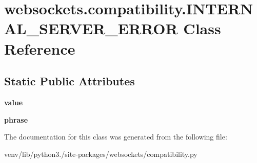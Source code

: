\hypertarget{classwebsockets_1_1compatibility_1_1_i_n_t_e_r_n_a_l___s_e_r_v_e_r___e_r_r_o_r}{}\section{websockets.\+compatibility.\+I\+N\+T\+E\+R\+N\+A\+L\+\_\+\+S\+E\+R\+V\+E\+R\+\_\+\+E\+R\+R\+OR Class Reference}
\label{classwebsockets_1_1compatibility_1_1_i_n_t_e_r_n_a_l___s_e_r_v_e_r___e_r_r_o_r}
\subsection*{Static Public Attributes}
\begin{DoxyCompactItemize}
\item 
\mbox{\label{classwebsockets_1_1compatibility_1_1_i_n_t_e_r_n_a_l___s_e_r_v_e_r___e_r_r_o_r_a6ee68a85cfd9d5c2d7fcf8f96265b646}} 
{\bfseries value}
\item 
\mbox{\label{classwebsockets_1_1compatibility_1_1_i_n_t_e_r_n_a_l___s_e_r_v_e_r___e_r_r_o_r_a27027df04f73b73321611a342778b8cb}} 
{\bfseries phrase}
\end{DoxyCompactItemize}


The documentation for this class was generated from the following file\+:\begin{DoxyCompactItemize}
\item 
venv/lib/python3./site-\/packages/websockets/compatibility.\+py\end{DoxyCompactItemize}
